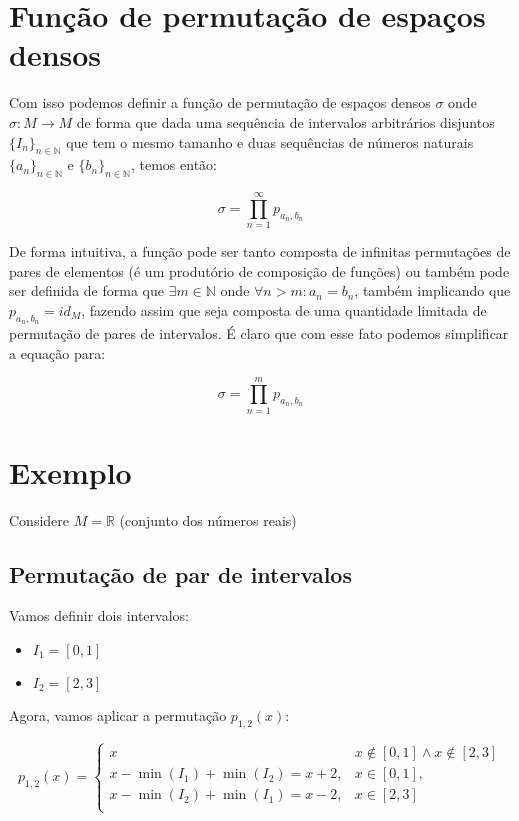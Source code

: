 \documentclass[12pt,a4paper]{article}
\begin{document}
\section{Função de permutação de espaços densos}

Com isso podemos definir a função de permutação de espaços densos $\sigma$ onde $\sigma: M \to M$ de forma que dada uma sequência de intervalos arbitrários disjuntos $\{I_n\}_{n\in\mathbb{N}}$ que tem o mesmo tamanho e duas sequências de números naturais $\{a_n\}_{n\in\mathbb{N}}$ e $\{b_n\}_{n\in\mathbb{N}}$, temos então:

\begin{equation}
 \sigma = \prod_{n=1}^{\infty} p_{a_n,b_n}
\end{equation}

De forma intuitiva, a função pode ser tanto composta de infinitas permutações de pares de elementos (é um produtório de composição de funções) ou também pode ser definida de forma que $\exists m \in \mathbb{N}$ onde $\forall n > m : a_n=b_n$, também implicando que $p_{a_n,b_n}=id_M$, fazendo assim que seja composta de uma quantidade limitada de permutação de pares de intervalos. É claro que com esse fato podemos simplificar a equação para:

\begin{equation}
\sigma = \prod_{n=1}^{m} p_{a_n,b_n}
\end{equation}

\section{Exemplo}

Considere $M = \mathbb{R}$ (conjunto dos números reais)

\subsection{Permutação de par de intervalos}

Vamos definir dois intervalos:
\begin{itemize}
\item $I_1 = [0, 1]$
\item $I_2 = [2, 3]$
\end{itemize}

Agora, vamos aplicar a permutação $p_{1,2}(x)$:

\begin{equation}
p_{1,2}(x) = \begin{cases} 
    x & x \not\in [0, 1] \land x \not \in [2, 3]\\
    x - \min(I_1) + \min(I_2) = x + 2, & x \in [0, 1],\\
    x - \min(I_2) + \min(I_1) = x - 2, & x \in [2, 3]\\
\end{cases}
\end{equation}
\end{document}
